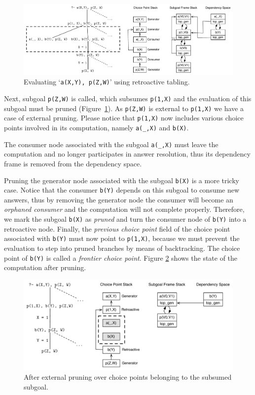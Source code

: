 \begin{figure}[ht]
  \centering
    \includegraphics[scale=0.5]{retro_example2.pdf}
  \caption{Evaluating `\texttt{a(X,Y),~p(Z,W)}' using retroactive tabling.}
  \label{fig:retro_eval2}
\end{figure}

Next, subgoal \texttt{p(Z,W)} is called, which subsumes \texttt{p(1,X)} and the evaluation of this subgoal
must be pruned (Figure~\ref{fig:retro_eval2}). As \texttt{p(Z,W)} is external to \texttt{p(1,X)} we have
a case of external pruning. Please notice that \texttt{p(1,X)} now includes various choice
points involved in its computation, namely \texttt{a(\_,X)} and \texttt{b(X)}.

The consumer node associated with the subgoal \texttt{a(\_,X)} must leave the computation and no longer
participates in answer resolution, thus its dependency frame is removed from the dependency space.

Pruning the generator node associated with the subgoal \texttt{b(X)} is a more tricky case. Notice that
the consumer \texttt{b(Y)} depends on this subgoal to consume new answers, thus by removing the generator node
the consumer will become an \textit{orphaned consumer} and the computation will not complete properly.
Therefore, we mark the subgoal \texttt{b(X)} as \textit{pruned} and turn the consumer node of \texttt{b(Y)}
into a retroactive node. Finally, the \textit{previous choice point} field of the choice point associated
with \texttt{b(Y)} must now point to \texttt{p(1,X)}, because we must prevent the evaluation to step into
pruned branches by means of backtracking. The choice point of \texttt{b(Y)} is called a
\textit{frontier choice point}. Figure \ref{fig:retro_eval3} shows the state of the computation after pruning.

\begin{figure}[ht]
  \centering
    \includegraphics[scale=0.5]{retro_example3.pdf}
  \caption{After external pruning over choice points belonging to the subsumed subgoal.}
  \label{fig:retro_eval3}
\end{figure}

